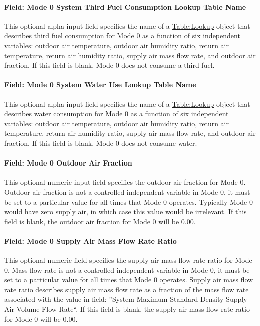 \paragraph{Field: Mode 0 System Third Fuel Consumption Lookup Table Name}
This optional alpha input field specifies the name of a \hyperref[tablelookup]{Table:Lookup} object that describes third fuel consumption for Mode 0 as a function of six independent variables: outdoor air temperature, outdoor air humidity ratio, return air temperature, return air humidity ratio, supply air mass flow rate, and outdoor air fraction. If this field is blank, Mode 0 does not consume a third fuel.

\paragraph{Field: Mode 0 System Water Use Lookup Table Name}
This optional alpha input field specifies the name of a \hyperref[tablelookup]{Table:Lookup} object that describes water consumption for Mode 0 as a function of six independent variables: outdoor air temperature, outdoor air humidity ratio, return air temperature, return air humidity ratio, supply air mass flow rate, and outdoor air fraction. If this field is blank, Mode 0 does not consume water.

\paragraph{Field: Mode 0 Outdoor Air Fraction}
This optional numeric input field specifies the outdoor air fraction for Mode 0. Outdoor air fraction is not a controlled independent variable in Mode 0, it must be set to a particular value for all times that Mode 0 operates. Typically Mode 0 would have zero supply air, in which case this value would be irrelevant. If this field is blank, the outdoor air fraction for Mode 0 will be 0.00.

\paragraph{Field: Mode 0 Supply Air Mass Flow Rate Ratio}
This optional numeric field specifies the supply air mass flow rate ratio for Mode 0. Mass flow rate is not a controlled independent variable in Mode 0, it must be set to a particular value for all times that Mode 0 operates. Supply air mass flow rate ratio describes supply air mass flow rate as a fraction of the mass flow rate associated with the value in field: ''System Maximum Standard Density Supply Air Volume Flow Rate``. If this field is blank, the supply air mass flow rate ratio for Mode 0 will be 0.00.

